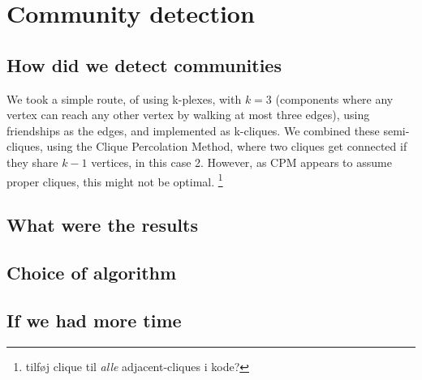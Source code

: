 \section{Community detection}

\subsection{How did we detect communities}
We took a simple route, of using k-plexes, with $k = 3$ (components where any vertex can reach any other vertex by walking at most three edges), using friendships as the edges, and implemented as k-cliques. We combined these semi-cliques, using the Clique Percolation Method, where two cliques get connected if they share $k - 1$ vertices, in this case 2. However, as CPM appears to assume proper cliques, this might not be optimal. \footnote{tilføj clique til \textit{alle} adjacent-cliques i kode?}


\subsection{What were the results}


\subsection{Choice of algorithm}


\subsection{If we had more time}

